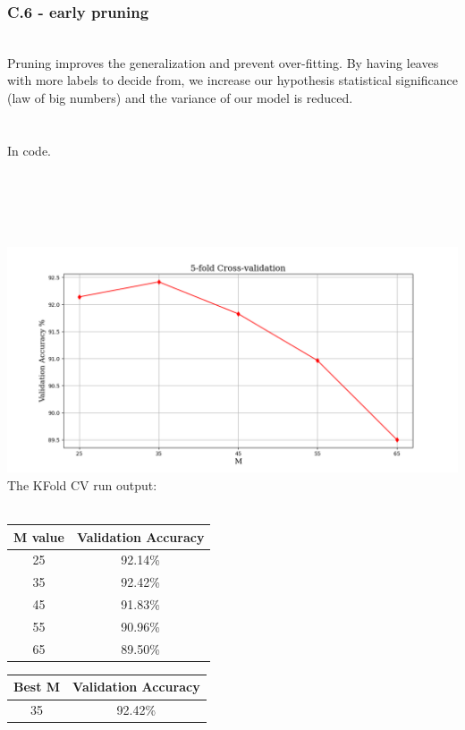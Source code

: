 \documentclass[12pt]{article}
\begin{document}
\subsubsection*{C.6 - early pruning}
\\
Pruning improves the generalization and prevent over-fitting. By having leaves with more labels to decide from, we increase our hypothesis statistical significance (law of big numbers) and the variance of our model is reduced.\\
\\
\\
In code.\\
\\
\newpage
{}\\
\\
\\
\\
\includegraphics[scale=0.4]{hw3/plots/cv4.png}
\\
The KFold CV run output:\\
\\
\begin{center}
\begin{tabular}{ |c|c| } 
 \hline
 M value & Validation Accuracy \\ 
 \hline\hline
 25 & 92.14\% \\ 
 35 & 92.42\% \\ 
 45 & 91.83\% \\ 
 55 & 90.96\% \\ 
 65 & 89.50\% \\ 
 \hline
\end{tabular}
\end{center}
\begin{center}
\begin{tabular}{ |c|c| } 
 \hline
Best M  & Validation Accuracy \\ 
 \hline\hline
 35 & 92.42\% \\ 
 \hline
\end{tabular}
\end{center}
\end{document}
